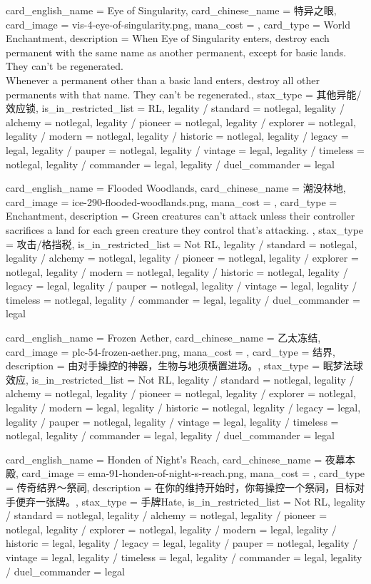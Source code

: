 \documentclass[lang = cn, color = black, 10pt]{AllThatStax}
\begin{document}
\card
{
	card_english_name = {Eye of Singularity},
	card_chinese_name = {特异之眼},
	card_image = vis-4-eye-of-singularity.png,
	mana_cost = ,
	card_type = World Enchantment,
	description = {When Eye of Singularity enters, destroy each permanent with the same name as another permanent, except for basic lands. They can't be regenerated.\\
		Whenever a permanent other than a basic land enters, destroy all other permanents with that name. They can't be regenerated.},
	stax_type = 其他异能/效应锁,
	is_in_restricted_list = RL,
	legality / standard = notlegal,
	legality / alchemy = notlegal,
	legality / pioneer = notlegal,
	legality / explorer = notlegal,
	legality / modern = notlegal,
	legality / historic = notlegal,
	legality / legacy = legal,
	legality / pauper = notlegal,
	legality / vintage = legal,
	legality / timeless = notlegal,
	legality / commander = legal,
	legality / duel_commander = legal
}

\card
{
	card_english_name = {Flooded Woodlands},
	card_chinese_name = {潮没林地},
	card_image = ice-290-flooded-woodlands.png,
	mana_cost = ,
	card_type = Enchantment,
	description = {Green creatures can't attack unless their controller sacrifices a land for each green creature they control that's attacking. },
	stax_type = 攻击/格挡税,
	is_in_restricted_list = Not RL,
	legality / standard = notlegal,
	legality / alchemy = notlegal,
	legality / pioneer = notlegal,
	legality / explorer = notlegal,
	legality / modern = notlegal,
	legality / historic = notlegal,
	legality / legacy = legal,
	legality / pauper = notlegal,
	legality / vintage = legal,
	legality / timeless = notlegal,
	legality / commander = legal,
	legality / duel_commander = legal
}

\card
{
	card_english_name = {Frozen Aether},
	card_chinese_name = {乙太冻结},
	card_image = plc-54-frozen-aether.png,
	mana_cost = ,
	card_type = 结界,
	description = {由对手操控的神器，生物与地须横置进场。},
	stax_type = 眠梦法球效应,
	is_in_restricted_list = Not RL,
	legality / standard = notlegal,
	legality / alchemy = notlegal,
	legality / pioneer = notlegal,
	legality / explorer = notlegal,
	legality / modern = legal,
	legality / historic = notlegal,
	legality / legacy = legal,
	legality / pauper = notlegal,
	legality / vintage = legal,
	legality / timeless = notlegal,
	legality / commander = legal,
	legality / duel_commander = legal
}

\card
{
	card_english_name = {Honden of Night's Reach},
	card_chinese_name = {夜幕本殿},
	card_image = ema-91-honden-of-night-s-reach.png,
	mana_cost = ,
	card_type = 传奇结界～祭祠,
	description = {在你的维持开始时，你每操控一个祭祠，目标对手便弃一张牌。},
	stax_type = 手牌Hate,
	is_in_restricted_list = Not RL,
	legality / standard = notlegal,
	legality / alchemy = notlegal,
	legality / pioneer = notlegal,
	legality / explorer = notlegal,
	legality / modern = legal,
	legality / historic = legal,
	legality / legacy = legal,
	legality / pauper = notlegal,
	legality / vintage = legal,
	legality / timeless = legal,
	legality / commander = legal,
	legality / duel_commander = legal
}
\end{document}
